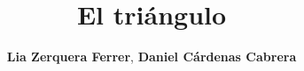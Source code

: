 \documentclass[sn-mathphys,Numbered]{sn-jnl}%
\theoremstyle{thmstyleone}%
\theoremstyle{thmstyletwo}%
\theoremstyle{thmstylethree}%
\begin{document}
\title[El tri\'angulo]{El tri\'angulo}


\author{\textbf{Lia Zerquera Ferrer},
\textbf{Daniel C\'ardenas Cabrera}}





% 
% 
% 
\end{document}
